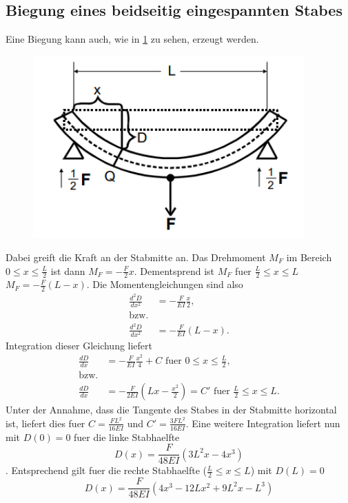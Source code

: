 \subsection{Biegung eines beidseitig eingespannten Stabes}
Eine Biegung kann auch, wie in \ref{Fig:Beidseitig} zu sehen, erzeugt werden.
\begin{figure}[H]
    \centering
    \captionsetup{justification=centering}
    \includegraphics[height=7cm]{"Beidseitig_Biegung.png"}
    \label{Fig:Beidseitig}
\end{figure}
Dabei greift die Kraft an der Stabmitte an. Das Drehmoment $M_F$ im Bereich $0\leq x \leq\frac{L}{2}$ ist dann $M_F=-\frac{F}{2}x$. Dementsprend ist $M_F$ fuer $\frac{L}{2}\leq x\leq L$ $M_F=-\frac{F}{2}(L-x)$.
Die Momentengleichungen sind also 
\begin{align*}
    \frac{d^2D}{dx^2}&=-\frac{F}{EI}\frac{x}{2},\\
    \text{bzw.}\\
    \frac{d^2D}{dx^2}&=-\frac{F}{EI}(L-x).  
\end{align*}
Integration dieser Gleichung liefert 
\begin{align*}
    \frac{dD}{dx}&=-\frac{F}{EI}\frac{x^2}{4}+C\text{  fuer  }0\leq x \leq\frac{L}{2},\\
    \text{bzw.}\\
    \frac{dD}{dx}&=-\frac{F}{2EI}(Lx-\frac{x^2}{2})=C'\text{  fuer  }\frac{L}{2}\leq x\leq L.
\end{align*}
Unter der Annahme, dass die Tangente des Stabes in der Stabmitte horizontal ist, liefert dies fuer $C=\frac{FL^2}{16EI}$ und $C'=\frac{3FL^2}{16EI}$. Eine weitere Integration liefert nun mit $D(0)=0$ fuer die linke Stabhaelfte
\begin{equation*}
    D(x)=\frac{F}{48EI}(3L^2x-4x^3)
\end{equation*}.
Entsprechend gilt fuer die rechte Stabhaelfte ($\frac{L}{2}\leq x\leq L$) mit $D(L)=0$ 
\begin{equation*}
    D(x)=\frac{F}{48EI}(4x^3-12Lx^2+9L^2x-L^3)
\end{equation*}
